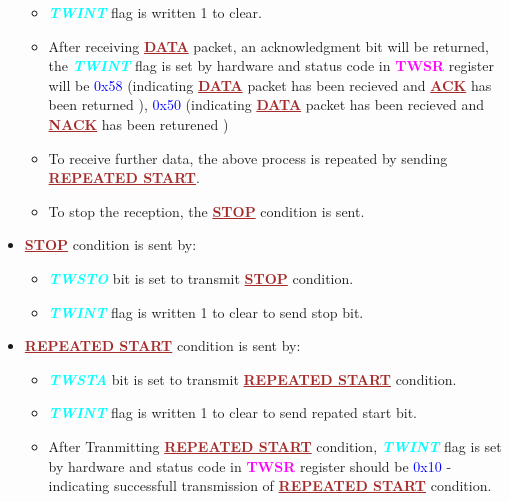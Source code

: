 \documentclass{article}
\newcommand{\bitFormat}[1]{\emph{\textbf{\textcolor{cyan}{#1}}}}
\newcommand{\regFormat}[1]{\textbf{\textcolor{magenta}{#1}}}
\newcommand{\iicFormat}[1]{\textbf{\textcolor{brown}{\underline{#1}}}}
\newcommand{\statusCode}[1]{{\textcolor{blue}{{ \LARGE #1}}}}
\begin{document}
\begin{itemize}
\begin{itemize}
        \item \bitFormat{TWINT} flag is written 1 to clear.
        \item After receiving \iicFormat{DATA} packet, an acknowledgment bit will be returned, the \bitFormat{TWINT} flag is set by hardware and status code in \regFormat{TWSR} register will be \statusCode{0x58} (indicating  \iicFormat{DATA} packet has been recieved and \iicFormat{ACK} has been returned ), \statusCode{0x50} (indicating  \iicFormat{DATA} packet has been recieved and \iicFormat{NACK} has been returened )
    \end{itemize}
    \begin{itemize}
        \item To receive further data, the above process is repeated by sending \iicFormat{REPEATED START}.
        \item To stop the reception, the \iicFormat{STOP} condition is sent.
    \end{itemize}
    \item \iicFormat{STOP} condition is sent by:
    \begin{itemize}
        \item \bitFormat{TWSTO} bit is set to transmit \iicFormat{STOP} condition.
        \item \bitFormat{TWINT} flag is written 1 to clear to send stop bit.
    \end{itemize}
    \item \iicFormat{REPEATED START} condition is sent by:
    \begin{itemize}
        \item \bitFormat{TWSTA} bit is set to transmit \iicFormat{REPEATED START} condition.
        \item \bitFormat{TWINT} flag is written 1 to clear to send repated start bit.
        \item After Tranmitting \iicFormat{REPEATED START} condition, \bitFormat{TWINT} flag is set by hardware and status code in \regFormat{TWSR} register should be \statusCode{0x10} - indicating successfull transmission of \iicFormat{REPEATED START} condition.
    \end{itemize}
\end{itemize}
\end{document}
